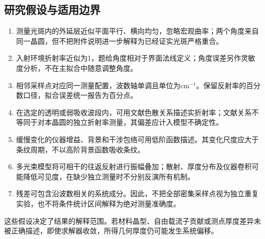 \subsection{研究假设与适用边界}
\begin{enumerate}
  \item 测量光斑内的外延层近似平面平行、横向均匀，忽略宏观曲率；两个角度来自同一晶圆，但不把附件说明进一步解释为已经证实光斑严格重合。
  \item 入射环境折射率近似为1，题给角度相对于界面法线定义；角度误差另作灵敏度分析，不在主拟合中随意调整角度。
  \item 相邻采样点对应同一测量配置，波数轴单调且单位为$\mathrm{cm}^{-1}$。保留反射率的百分数口径，拟合误差统一报告为百分点。
  \item 在选定的透明或弱吸收波段内，可用文献色散关系描述实折射率；文献关系不等同于对本晶圆的独立折射率测量，其偏差应计入模型不确定性。
  \item 缓慢变化的仪器增益、背景和干涉包络可用低阶函数描述。其变化尺度应大于条纹周期，不以高阶背景函数吸收条纹。
  \item 多光束模型将可相干的往返反射进行振幅叠加；散射、厚度分布及仪器卷积可能降低可见度，在缺少独立测量时不分别反演所有机制。
  \item 残差可包含沿波数相关的系统成分。因此，不把全部密集采样点视为独立重复实验，也不将条件统计区间解释为绝对测量准确度。
\end{enumerate}
这些假设决定了结果的解释范围。若材料晶型、自由载流子贡献或测点厚度差异未被正确描述，即使求解器收敛，所得几何厚度仍可能发生系统偏移。

